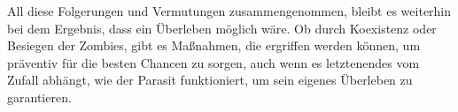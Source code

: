     All diese Folgerungen und Vermutungen zusammengenommen, bleibt es weiterhin bei dem Ergebnis, dass ein Überleben möglich wäre. Ob durch Koexistenz oder Besiegen der Zombies, gibt es Maßnahmen, die ergriffen werden können, um präventiv für die besten Chancen zu sorgen, auch wenn es letztenendes vom Zufall abhängt, wie der Parasit funktioniert, um sein eigenes Überleben zu garantieren.
